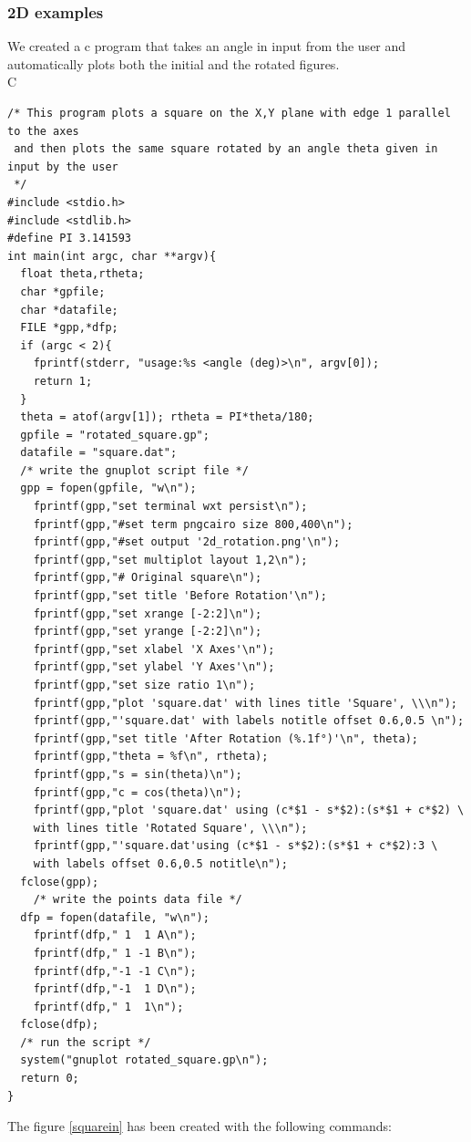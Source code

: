 \documentclass[a4paper,10pt]{article}
\begin{document}
\subsubsection{2D examples}
We created a c program that takes an angle in input from the user and automatically plots both the initial
and the rotated figures.\\
C
\begin{verbatim}
/* This program plots a square on the X,Y plane with edge 1 parallel to the axes
 and then plots the same square rotated by an angle theta given in input by the user
 */
#include <stdio.h>
#include <stdlib.h>
#define PI 3.141593
int main(int argc, char **argv){
  float theta,rtheta;
  char *gpfile;
  char *datafile;
  FILE *gpp,*dfp;
  if (argc < 2){
    fprintf(stderr, "usage:%s <angle (deg)>\n", argv[0]);
    return 1;
  }
  theta = atof(argv[1]); rtheta = PI*theta/180;
  gpfile = "rotated_square.gp";
  datafile = "square.dat";
  /* write the gnuplot script file */
  gpp = fopen(gpfile, "w\n");
    fprintf(gpp,"set terminal wxt persist\n");
    fprintf(gpp,"#set term pngcairo size 800,400\n");
    fprintf(gpp,"#set output '2d_rotation.png'\n");
    fprintf(gpp,"set multiplot layout 1,2\n");
    fprintf(gpp,"# Original square\n");
    fprintf(gpp,"set title 'Before Rotation'\n");
    fprintf(gpp,"set xrange [-2:2]\n");
    fprintf(gpp,"set yrange [-2:2]\n");
    fprintf(gpp,"set xlabel 'X Axes'\n");
    fprintf(gpp,"set ylabel 'Y Axes'\n");
    fprintf(gpp,"set size ratio 1\n");
    fprintf(gpp,"plot 'square.dat' with lines title 'Square', \\\n");
    fprintf(gpp,"'square.dat' with labels notitle offset 0.6,0.5 \n");
    fprintf(gpp,"set title 'After Rotation (%.1f°)'\n", theta);
    fprintf(gpp,"theta = %f\n", rtheta);
    fprintf(gpp,"s = sin(theta)\n");
    fprintf(gpp,"c = cos(theta)\n");
    fprintf(gpp,"plot 'square.dat' using (c*$1 - s*$2):(s*$1 + c*$2) \
    with lines title 'Rotated Square', \\\n");
    fprintf(gpp,"'square.dat'using (c*$1 - s*$2):(s*$1 + c*$2):3 \
    with labels offset 0.6,0.5 notitle\n");
  fclose(gpp);
    /* write the points data file */
  dfp = fopen(datafile, "w\n");
    fprintf(dfp," 1  1 A\n");
    fprintf(dfp," 1 -1 B\n");
    fprintf(dfp,"-1 -1 C\n");
    fprintf(dfp,"-1  1 D\n");
    fprintf(dfp," 1  1\n");
  fclose(dfp);
  /* run the script */
  system("gnuplot rotated_square.gp\n");
  return 0;
}
\end{verbatim}
The figure \ref{squarein} has been created with the following commands:\\
\end{document}
